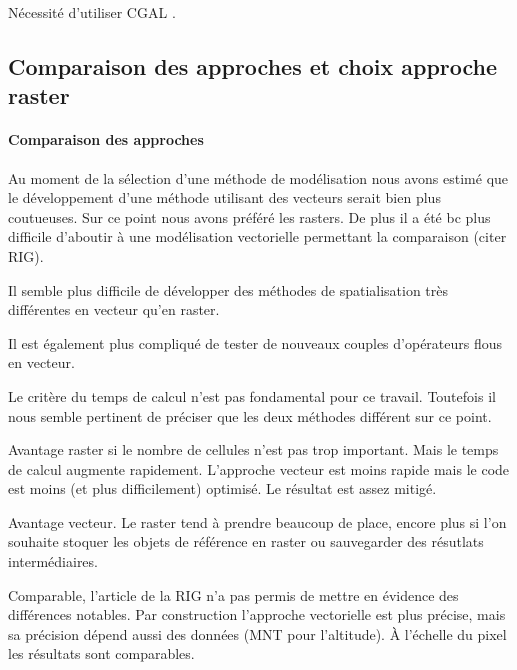 Nécessité d'utiliser CGAL \autocite{CGAL2019}.




\subsection{Comparaison des approches et choix approche raster}

\paragraph{Comparaison des approches}


Au moment de la sélection d'une méthode de modélisation nous avons
estimé que le développement d'une méthode utilisant des vecteurs
serait bien plus coutueuses. Sur ce point nous avons préféré les
rasters. De plus il a été bc plus difficile d'aboutir à une
modélisation vectorielle permettant la comparaison (citer RIG).


Il semble plus difficile de développer des méthodes de spatialisation
très différentes en vecteur qu'en raster.

Il est également plus compliqué de tester de nouveaux couples
d'opérateurs flous en vecteur.



Le critère du temps de calcul n'est pas fondamental pour ce
travail. Toutefois il nous semble pertinent de préciser que les deux
méthodes différent sur ce point.

Avantage raster si le nombre de cellules n'est pas trop
important. Mais le temps de calcul augmente rapidement. L'approche
vecteur est moins rapide mais le code est moins (et plus
difficilement) optimisé. Le résultat est assez mitigé.


Avantage vecteur. Le raster tend à prendre beaucoup de place, encore
plus si l'on souhaite stoquer les objets de référence en raster ou
sauvegarder des résutlats intermédiaires.


Comparable, l'article de la RIG n'a pas permis de mettre en évidence
des différences notables. Par construction l'approche vectorielle est
plus précise, mais sa précision dépend aussi des données (MNT pour
l'altitude). À l'échelle du pixel les résultats sont comparables.

